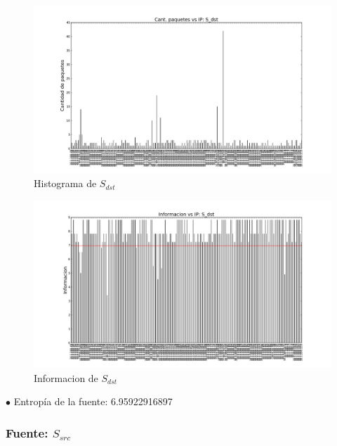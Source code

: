 \begin{figure}[H]\centering
    \includegraphics[width=\linewidth]{../imgs/red-entrepiso-dc_S_dst_hist.png}
    \caption{Histograma de $S_{dst}$}\label{fig:entrepiso-dc-dst-hist}
\end{figure}

\begin{figure}[H]\centering
    \includegraphics[width=\linewidth]{../imgs/red-entrepiso-dc_S_dst_info.png}
    \caption{Informacion de $S_{dst}$}\label{fig:entrepiso-dc-dst-info}
\end{figure}

$\bullet$ Entropía de la fuente: 6.95922916897

\subsubsection{Fuente: $S_{src}$}

